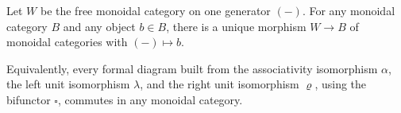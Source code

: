 Let $W$ be the free monoidal category on one generator $(-)$. For any monoidal category $B$ and any object $b \in B$, there is a unique morphism $W \to B$ of monoidal categories with $(-) \mapsto b$.

Equivalently, every formal diagram built from the associativity isomorphism $\alpha$, the left unit isomorphism $\lambda$, and the right unit isomorphism $\varrho$, using the bifunctor $\square$, commutes in any monoidal category.
